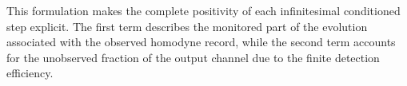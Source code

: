 This formulation makes the complete positivity of each infinitesimal conditioned step explicit. The first term describes the monitored part of the evolution associated with the observed homodyne record, while the second term accounts for the unobserved fraction of the output channel due to the finite detection efficiency.

